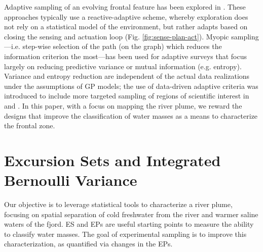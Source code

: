 \documentclass[aoas]{imsart}
\begin{document}
Adaptive sampling of an evolving frontal feature has been explored in
\cite{fronts11,Zhang2012,Pinto2018,costa19}. These approaches
typically use a reactive-adaptive scheme, whereby exploration does not
rely on a statistical model of the environment, but rather adapts
based on closing the sensing and actuation loop
(Fig. \ref{fig:sense-plan-act}). Myopic sampling—i.e. step-wise
selection of the path (on the graph) which reduces the information
criterion the most—has been used for adaptive surveys
\citep{singh2009efficient,Binney2013} that focus largely on reducing
predictive variance or mutual information (e.g. entropy). Variance and
entropy reduction are independent of the actual data realizations
under the assumptions of GP models; the use of data-driven adaptive
criteria was introduced to include more targeted sampling of regions
of scientific interest in \cite{Low2009} and \cite{fossuminformation}.
In this paper, with a focus on mapping the river plume, we reward
the designs that improve the classification of water masses as a
means to characterize the frontal zone.







\section{Excursion Sets and Integrated Bernoulli Variance}
\label{sec:ESEP}

Our objective is to leverage statistical tools to characterize a river plume, focusing on spatial separation of cold freshwater from the river and warmer saline waters of the fjord. ES and EPs are useful starting points to measure the ability to classify water masses. The goal of experimental sampling is to improve this characterization, as quantified via changes in the EPs.
\end{document}
